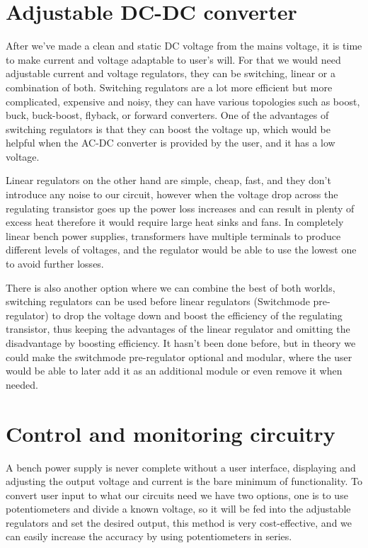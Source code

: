 \documentclass[a4paper, twocolumn]{article}
\begin{document}
\section{Adjustable DC-DC converter}
	After we've made a clean and static DC voltage from the mains voltage, it is time to make current and voltage adaptable to user's will. For that we would need adjustable current and voltage regulators, they can be switching, linear or a combination of both. Switching regulators are a lot more efficient but more complicated, expensive and noisy, they can have various topologies such as boost, buck, buck-boost, flyback, or forward converters. One of the advantages of switching regulators is that they can boost the voltage up, which would be helpful when the AC-DC converter is provided by the user, and it has a low voltage. 

	Linear regulators on the other hand are simple, cheap, fast, and they don't introduce any noise to our circuit, however when the voltage drop across the regulating transistor goes up the power loss increases and can result in plenty of excess heat therefore it would require large heat sinks and fans. In completely linear bench power supplies, transformers have multiple terminals to produce different levels of voltages, and the regulator would be able to use the lowest one to avoid further losses.
	
	There is also another option where we can combine the best of both worlds, switching regulators can be used before linear regulators (Switchmode pre-regulator) to drop the voltage down and boost the efficiency of the regulating transistor, thus keeping the advantages of the linear regulator and omitting the disadvantage by boosting efficiency. It hasn't been done before, but in theory we could make the switchmode pre-regulator optional and modular, where the user would be able to later add it as an additional module or even remove it when needed.
\section{Control and monitoring circuitry}
    A bench power supply is never complete without a user interface, displaying and adjusting the output voltage and current is the bare minimum of functionality. To convert user input to what our circuits need we have two options, one is to use potentiometers and divide a known voltage, so it will be fed into the adjustable regulators and set the desired output, this method is very cost-effective, and we can easily increase the accuracy by using potentiometers in series.
\end{document}
